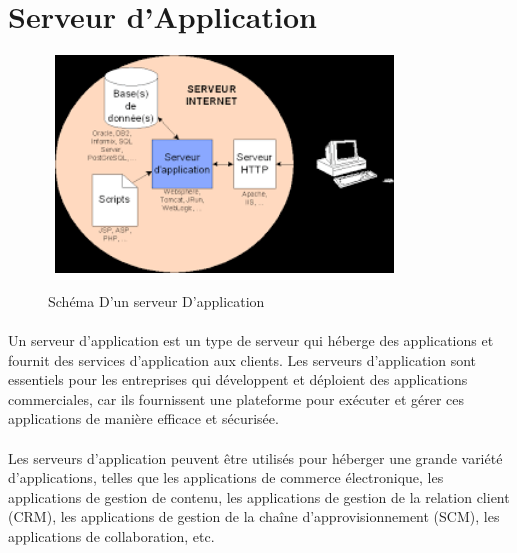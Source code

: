 \section{Serveur d'Application}
	\begin{figure}[h]
		\hbox{
	\includegraphics[width=0.8\textwidth]{PhotoMemoire/serveur_application.png}}
\caption{Schéma D'un serveur D'application}
\end{figure}
\paragraph{ }

Un serveur d'application est un type de serveur qui héberge des applications et fournit des services d'application aux clients. Les serveurs d'application sont essentiels pour les entreprises qui développent et déploient des applications commerciales, car ils fournissent une plateforme pour exécuter et gérer ces applications de manière efficace et sécurisée.
\paragraph{ }
Les serveurs d'application peuvent être utilisés pour héberger une grande variété d'applications, telles que les applications de commerce électronique, les applications de gestion de contenu, les applications de gestion de la relation client (CRM), les applications de gestion de la chaîne d'approvisionnement (SCM), les applications de collaboration, etc.

